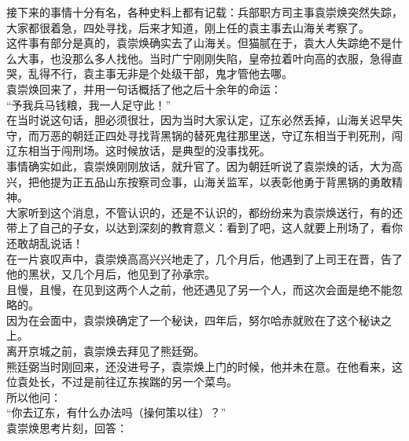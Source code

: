 \begin{multicols}{\theparacolNo}
接下来的事情十分有名，各种史料上都有记载：兵部职方司主事袁崇焕突然失踪，大家都很着急，四处寻找，后来才知道，刚上任的袁主事去山海关考察了。\\

这件事有部分是真的，袁崇焕确实去了山海关。但猫腻在于，袁大人失踪绝不是什么大事，也没那么多人找他。当时广宁刚刚失陷，皇帝拉着叶向高的衣服，急得直哭，乱得不行，袁主事无非是个处级干部，鬼才管他去哪。\\

袁崇焕回来了，并用一句话概括了他之后十余年的命运：\\

“予我兵马钱粮，我一人足守此！”\\

在当时说这句话，胆必须很壮，因为当时大家认定，辽东必然丢掉，山海关迟早失守，而万恶的朝廷正四处寻找背黑锅的替死鬼往那里送，守辽东相当于判死刑，闯辽东相当于闯刑场。这时候放话，是典型的没事找死。\\

事情确实如此，袁崇焕刚刚放话，就升官了。因为朝廷听说了袁崇焕的话，大为高兴，把他提为正五品山东按察司佥事，山海关监军，以表彰他勇于背黑锅的勇敢精神。\\

大家听到这个消息，不管认识的，还是不认识的，都纷纷来为袁崇焕送行，有的还带上了自己的子女，以达到深刻的教育意义：看到了吧，这人就要上刑场了，看你还敢胡乱说话！\\

在一片哀叹声中，袁崇焕高高兴兴地走了，几个月后，他遇到了上司王在晋，告了他的黑状，又几个月后，他见到了孙承宗。\\

且慢，且慢，在见到这两个人之前，他还遇见了另一个人，而这次会面是绝不能忽略的。\\

因为在会面中，袁崇焕确定了一个秘诀，四年后，努尔哈赤就败在了这个秘诀之上。\\

离开京城之前，袁崇焕去拜见了熊廷弼。\\

熊廷弼当时刚回来，还没进号子，袁崇焕上门的时候，他并未在意。在他看来，这位袁处长，不过是前往辽东挨踹的另一个菜鸟。\\

所以他问：\\

“你去辽东，有什么办法吗（操何策以往）？”\\

袁崇焕思考片刻，回答：\\


\end{multicols}
